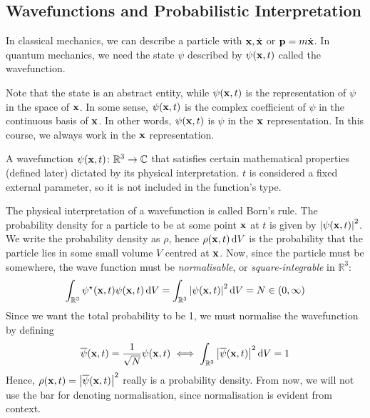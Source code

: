 \subsection{Wavefunctions and Probabilistic Interpretation}
In classical mechanics, we can describe a particle with \( \vb x, \dot{\vb x} \) or \( \vb p = m \dot{\vb x} \).
In quantum mechanics, we need the state \( \psi \) described by \( \psi(\vb x, t) \) called the wavefunction.
\begin{remark}
	Note that the state is an abstract entity, while \( \psi(\vb x, t) \) is the representation of \( \psi \) in the space of \( \vb x \).
	In some sense, \( \psi(\vb x, t) \) is the complex coefficient of \( \psi \) in the continuous basis of \( \vb x \).
	In other words, \( \psi(\vb x, t) \) is \( \psi \) in the \( \vb x \) representation.
	In this course, we always work in the \( \vb x \) representation.
\end{remark}
\begin{definition}
	A wavefunction \( \psi(\vb x, t) \colon \mathbb R^3 \to \mathbb C \) that satisfies certain mathematical properties (defined later) dictated by its physical interpretation.
	\( t \) is considered a fixed external parameter, so it is not included in the function's type.
\end{definition}
The physical interpretation of a wavefunction is called Born's rule.
The probability density for a particle to be at some point \( \vb x \) at \( t \) is given by \( \abs{\psi(\vb x, t)}^2 \).
We write the probability density as \( \rho \), hence \( \rho(\vb x, t) \dd{V} \) is the probability that the particle lies in some small volume \( V \) centred at \( \vb x \).
Now, since the particle must be somewhere, the wave function must be \textit{normalisable}, or \textit{square-integrable} in \( \mathbb R^3 \):
\[
	\int_{\mathbb R^3} \psi^\star(\vb x, t) \psi(\vb x, t) \dd{V} = \int_{\mathbb R^3} \abs{\psi(\vb x, t)}^2 \dd{V} = N \in (0, \infty)
\]
Since we want the total probability to be 1, we must normalise the wavefunction by defining
\[
	\overline{\psi}(\vb x, t) = \frac{1}{\sqrt{N}} \psi(\vb x, t) \iff \int_{\mathbb R^3} \abs{\overline{\psi}(\vb x, t)}^2 \dd{V} = 1
\]
Hence, \( \rho(\vb x,t) = \abs{\overline{\psi}(\vb x,t)}^2 \) really is a probability density.
From now, we will not use the bar for denoting normalisation, since normalisation is evident from context.
